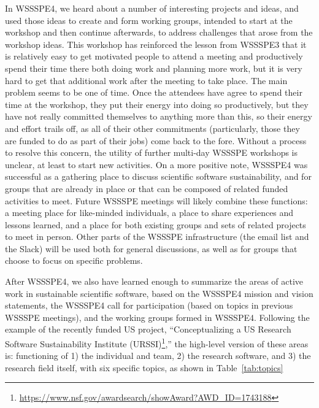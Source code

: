 \documentclass[11pt, oneside]{amsart}
\begin{document}
In WSSSPE4, we heard about a number of interesting projects and ideas, and used those
ideas to create and form working groups, intended to start at the workshop and then
continue afterwards, to address challenges that arose from the workshop ideas. This workshop
has reinforced the lesson from WSSSPE3 that it is relatively easy to get motivated people
to attend a meeting and productively spend their time there both doing work and planning
more work, but it is very hard to get that additional work after the meeting to take place.
The main problem seems to be one of time.  Once the attendees have agree to spend
their time at the workshop, they put their energy into doing so productively, but they have not
really committed themselves to anything more than this, so their energy and effort trails
off, as all of their other commitments (particularly, those they are funded to do as part of
their jobs) come back to the fore. Without a process to resolve this concern, the utility of
further multi-day WSSSPE workshops is unclear, at least to start new activities.  On a more
positive note, WSSSPE4 was successful as a gathering place to discuss scientific
software sustainability, and for groups that are already in place or that can be composed
of related funded activities to meet.  Future WSSSPE meetings will likely combine these
functions: a meeting place for like-minded individuals, a place to share experiences and
lessons learned, and a place for both existing groups and sets of related projects to meet
in person.  Other parts of the WSSSPE infrastructure (the email list and the Slack) will
be used both for general discussions, as well as for groups that choose to focus
on specific problems.

After WSSSPE4, we also have learned enough to summarize the areas of active work
in sustainable scientific software, based on the WSSSPE4 mission and vision statements, the WSSSPE4 call for participation (based on topics in previous WSSSPE meetings), and the working groups formed in WSSSPE4.  Following the example of the recently funded US project,
``Conceptualizing a US Research Software Sustainability Institute (URSSI)\footnote{\url{https://www.nsf.gov/awardsearch/showAward?AWD_ID=1743188}},'' the high-level
version of these areas is: functioning of 1) the individual and team, 2) the research software, and 3) the research field itself, with six specific topics, as shown in Table~\ref{tab:topics}
\end{document}
